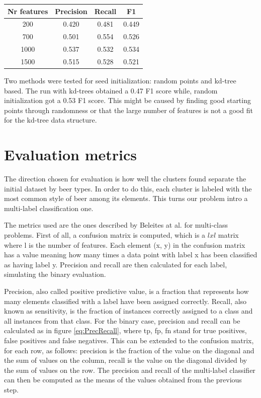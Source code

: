 \documentclass[12pt]{article}
\begin{document}
	\begin{center}
		\label{tab:features}
		\begin{tabular}{ |c|c|c|c| } 
			\hline
			Nr features & Precision & Recall & F1 \\
			\hline
			200 & 0.420 & 0.481 & 0.449 \\
			700 & 0.501 & 0.554 & 0.526 \\
			1000 & 0.537 & 0.532 & 0.534 \\
			1500 & 0.515 & 0.528 & 0.521 \\
			\hline
		\end{tabular}
	\end{center}

	Two methods were tested for seed initialization: random points and kd-tree based. The run with kd-trees obtained a 0.47 F1 score while, random initialization got a 0.53 F1 score. This might be caused by finding good starting points through randomness or that the large number of features is not a good fit for the kd-tree data structure.

	\section{Evaluation metrics}
	The direction chosen for evaluation is how well the clusters found separate the initial dataset by beer types. In order to do this, each cluster is labeled with the most common style of beer among its elements. This turns our problem intro a multi-label classification one.
	
	The metrics used are the ones described by Beleites at al.\cite{MultilabelClassification} for multi-class problems. First of all, a confusion matrix is computed, which is a \(lxl\) matrix where l is the number of features. Each element (x, y) in the confusion matrix has a value meaning how many times a data point with label x has been classified as having label y. Precision and recall are then calculated for each label, simulating the binary evaluation. 
	
	Precision, also called positive predictive value, is a fraction that represents how many elements classified with a label have been assigned correctly. Recall, also known as sensitivity, is the fraction of instances correctly assigned to a class and all instances from that class. For the binary case, precision and recall can be calculated as in figure \ref{eq:PrecRecall}, where tp, fp, fn stand for true positives, false positives and false negatives. This can be extended to the confusion matrix, for each row, as follows: precision is the fraction of the value on the diagonal and the sum of values on the column, recall is the value on the diagonal divided by the sum of values on the row. The precision and recall of the multi-label classifier can then be computed as the means of the values obtained from the previous step.
	
\end{document}
